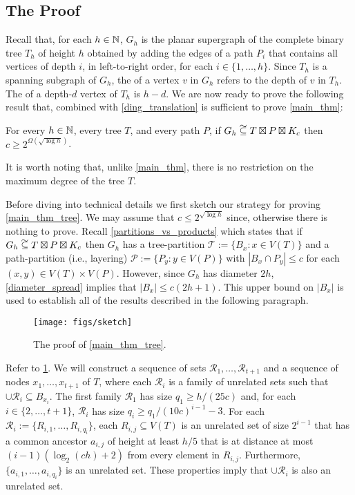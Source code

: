 \documentclass{patmorin}
\newcommand\subsetcong{\mathrel{\text{%
    \setbox0\hbox{$\subseteq$}%
    \rlap{\hbox to \wd0{\hss\hss\hss\raisebox{1.5\height}{$\sim$}\hss}}\box0
}}}
\renewcommand{\le}{\leqslant}
\renewcommand{\ge}{\geqslant}
\begin{document}
\subsection{The Proof}

Recall that, for each $h\in\mathbb{N}$, $G_{h}$ is the planar supergraph of the complete binary tree $T_h$ of height $h$ obtained by adding the edges of a path $P_i$ that contains all vertices of depth $i$, in left-to-right order, for each $i\in\{1,\ldots,h\}$.   Since $T_h$ is a spanning subgraph of $G_h$, the  of a vertex $v$ in $G_h$ refers to the depth of $v$ in $T_h$.  The  of a depth-$d$ vertex of $T_h$ is $h-d$.
We are now ready to prove the following result that, combined with \cref{ding_translation} is sufficient to prove \cref{main_thm}:

\begin{thm}\label{main_thm_tree}
  For every $h\in\mathbb{N}$, every tree $T$, and every path $P$, if $G_{h}\subsetcong T\boxtimes P\boxtimes K_c$ then $c\ge 2^{\Omega(\sqrt{\log h})}$.
\end{thm}

It is worth noting that, unlike \cref{main_thm}, there is no restriction on the maximum degree of the tree $T$.

Before diving into technical details we first sketch our strategy for proving \cref{main_thm_tree}.  We may assume that $c \le 2^{\sqrt{\log h}}$ since, otherwise there is nothing to prove.  Recall \cref{partitions_vs_products} which states that if $G_h\subsetcong T\boxtimes P\boxtimes K_c$ then $G_h$ has a tree-partition $\mathcal{T}:=\{B_x:x\in V(T)\}$ and a path-partition (i.e., layering) $\mathcal{P}:=\{P_y:y\in V(P)\}$ with $|B_x\cap P_y|\le c$ for each $(x,y)\in V(T)\times V(P)$. However, since $G_h$ has diameter $2h$, \cref{diameter_spread} implies that $|B_x|\le c(2h+1)$. This upper bound on $|B_x|$ is used to establish all of the results described in the following paragraph.

\begin{figure}
  \begin{center}
    \texttt{[image: figs/sketch]}
  \end{center}
  \caption{The proof of \cref{main_thm_tree}.}
  \label{sketch}
\end{figure}

Refer to \cref{sketch}.  We will construct a sequence of sets $\mathcal{R}_1,\ldots,\mathcal{R}_{t+1}$ and a sequence of nodes $x_1,\ldots,x_{t+1}$ of $T$, where each $\mathcal{R}_i$ is a family of unrelated sets such that $\cup\mathcal{R}_i\subseteq B_{x_i}$. The first family $\mathcal{R}_1$ has size $q_1\ge h/(25c)$ and, for each $i\in\{2,\ldots,t+1\}$, $\mathcal{R}_i$ has size $q_i\ge q_1/(10c)^{i-1}-3$. For each $\mathcal{R}_i:=\{R_{i,1},\ldots,R_{i,q_i}\}$, each $R_{i,j}\subseteq V(T)$ is an unrelated set of size $2^{i-1}$ that has a common ancestor $a_{i,j}$ of height at least $h/5$ that is at distance at most $(i-1)(\log_2(ch)+2)$ from every element in $R_{i,j}$. Furthermore, $\{a_{i,1},\ldots,a_{i,q_{i}}\}$ is an unrelated set. These properties imply that $\cup\mathcal{R}_i$ is also an unrelated set.
\end{document}
